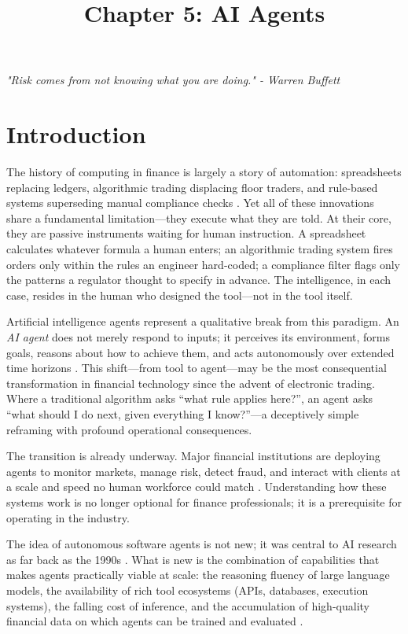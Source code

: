 \documentclass{article}
\title{Chapter 5: AI Agents}
\author{}
\date{}
\begin{document}
\maketitle

\textit{"Risk comes from not knowing what you are doing." - Warren Buffett}

\section{Introduction}

The history of computing in finance is largely a story of automation: spreadsheets replacing ledgers, algorithmic trading displacing floor traders, and rule-based systems superseding manual compliance checks \cite{bookstaber2007demon}. Yet all of these innovations share a fundamental limitation—they execute what they are told. At their core, they are passive instruments waiting for human instruction. A spreadsheet calculates whatever formula a human enters; an algorithmic trading system fires orders only within the rules an engineer hard-coded; a compliance filter flags only the patterns a regulator thought to specify in advance. The intelligence, in each case, resides in the human who designed the tool—not in the tool itself.

Artificial intelligence agents represent a qualitative break from this paradigm. An \textit{AI agent} does not merely respond to inputs; it perceives its environment, forms goals, reasons about how to achieve them, and acts autonomously over extended time horizons \cite{russell2020artificial}. This shift—from tool to agent—may be the most consequential transformation in financial technology since the advent of electronic trading. Where a traditional algorithm asks ``what rule applies here?'', an agent asks ``what should I do next, given everything I know?''—a deceptively simple reframing with profound operational consequences.

The transition is already underway. Major financial institutions are deploying agents to monitor markets, manage risk, detect fraud, and interact with clients at a scale and speed no human workforce could match \cite{accenture2023banking}. Understanding how these systems work is no longer optional for finance professionals; it is a prerequisite for operating in the industry.

The idea of autonomous software agents is not new; it was central to AI research as far back as the 1990s \cite{wooldridge1995intelligent}. What is new is the combination of capabilities that makes agents practically viable at scale: the reasoning fluency of large language models, the availability of rich tool ecosystems (APIs, databases, execution systems), the falling cost of inference, and the accumulation of high-quality financial data on which agents can be trained and evaluated \cite{openai2023gpt4, cui2023survey}.
\end{document}
